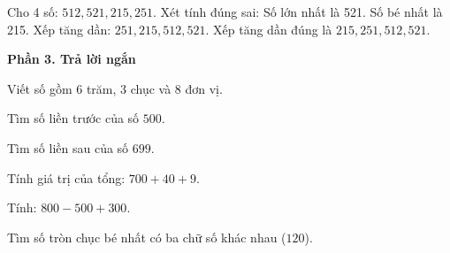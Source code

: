 \begin{ex} %
Cho 4 số: $512, 521, 215, 251$. Xét tính đúng sai:
\choiceTF
{\True Số lớn nhất là 521.}
{\True Số bé nhất là 215.}
{Xếp tăng dần: $251, 215, 512, 521$.}
{\True Xếp tăng dần đúng là $215, 251, 512, 521$.}
\end{ex}

\textbf{Phần 3. Trả lời ngắn}

\begin{ex} %
Viết số gồm 6 trăm, 3 chục và 8 đơn vị.
\end{ex}

\begin{ex} %
Tìm số liền trước của số $500$.
\end{ex}

\begin{ex} %
Tìm số liền sau của số $699$.
\end{ex}

\begin{ex} %
Tính giá trị của tổng: $700 + 40 + 9$.
\end{ex}

\begin{ex} %
Tính: $800 - 500 + 300$.
\end{ex}

\begin{ex} %
Tìm số tròn chục bé nhất có ba chữ số khác nhau ($120$).
\end{ex}

